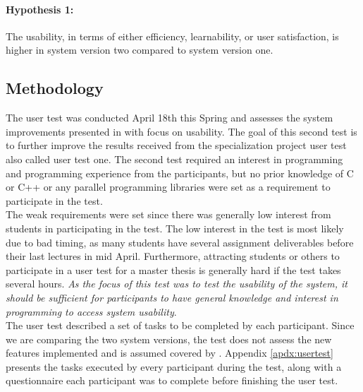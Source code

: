 \paragraph*{Hypothesis 1:} The usability, in terms of either efficiency, learnability, or user satisfaction, is higher in system version two compared to system version one. \hfill \\



\subsection{Methodology}
\label{sub-sec:user-testing-methodology}
The user test was conducted April 18th this Spring and assesses the system improvements presented in  with focus on usability. The goal of this second test is to further improve the results received from the specialization project user test also called user test one. The second test required an interest in programming and programming experience from the participants, but no prior knowledge of C or C++ or any parallel programming libraries were set as a requirement to participate in the test. \\

The weak requirements were set since there was generally low interest from students in participating in the test. The low interest in the test is most likely due to bad timing, as many students have several assignment deliverables before their last lectures in mid April. Furthermore, attracting students or others to participate in a user test for a master thesis is generally hard if the test takes several hours. \textit{As the focus of this test was to test the usability of the system, it should be sufficient for participants to have general knowledge and interest in programming to access system usability}. \\

The user test described a set of tasks to be completed by each participant. Since we are comparing the two system versions, the test does not assess the new features implemented and is assumed covered by . Appendix \ref{apdx:usertest} presents the tasks executed by every participant during the test, along with a questionnaire each participant was to complete before finishing the user test. \\

